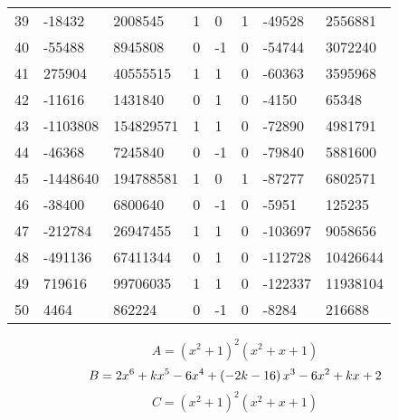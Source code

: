 \documentclass{amsart}
\begin{document}
\begin{longtable}{|l|l|l|lllll|}
39&-18432&2008545&1&0&1&-49528&2556881\\
40&-55488&8945808&0&-1&0&-54744&3072240\\
41&275904&40555515&1&1&0&-60363&3595968\\
42&-11616&1431840&0&1&0&-4150&65348\\
43&-1103808&154829571&1&1&0&-72890&4981791\\
44&-46368&7245840&0&-1&0&-79840&5881600\\
45&-1448640&194788581&1&0&1&-87277&6802571\\
46&-38400&6800640&0&-1&0&-5951&125235\\
47&-212784&26947455&1&1&0&-103697&9058656\\
48&-491136&67411344&0&1&0&-112728&10426644\\
49&719616&99706035&1&1&0&-122337&11938104\\
50&4464&862224&0&-1&0&-8284&216688\\
\hline
\end{longtable}
$$A=(x^2
 + 1)^{2}(x^2
 + x
 + 1)$$
$$B=2\*x^6
 + k\*x^5
 - 6\*x^4
 + \left(-2\*k
 - 16\right) \*x^3
 - 6\*x^2
 + k\*x
 + 2$$
$$C=(x^2
 + 1)^{2}(x^2
 + x
 + 1)$$
\end{document}
